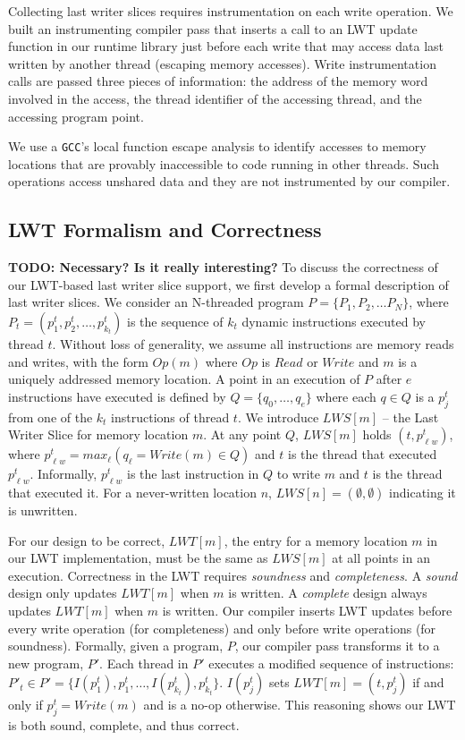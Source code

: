 \documentclass[preprint,9pt]{sigplanconf}
\newcommand{\lwt}{LWT\xspace}
\begin{document}
Collecting last writer slices requires instrumentation on each write operation.
We built an instrumenting compiler pass that inserts a call to an \lwt update
function in our runtime library just before each write that may access data
last written by another thread (escaping memory accesses).  Write
instrumentation calls are passed three pieces of information: the address of
the memory word involved in the access, the thread identifier of the accessing
thread, and the accessing program point.   

We use a {\tt GCC}'s local function escape analysis to identify accesses to
memory locations that are provably inaccessible to code running in other
threads.  Such operations access unshared data and they are not instrumented by
our compiler.  


\subsection{\lwt Formalism and Correctness}
{\bf TODO: Necessary?  Is it really interesting?}
\label{sec:lwssoundness}
To discuss the correctness of our \lwt-based last writer slice support, we
first develop a formal description of last writer slices.  We consider an
N-threaded program $P = \{P_1, P_2, \ldots P_N\}$, where $P_t = (p^{t}_{1},
p^{t}_{2}, \ldots, p^{t}_{k_{t}})$ is the sequence of $k_{t}$ dynamic
instructions executed by thread $t$.  Without loss of generality, we assume all
instructions are memory reads and writes, with the form $Op(m)$ where $Op$ is
$Read$ or $Write$ and $m$ is a uniquely addressed memory location.
A point in an execution of $P$ after $e$ instructions have
executed is defined by $Q = \{q_{0}, \ldots, q_{e}\}$ where each $q \in Q$ is a
$p^{t}_{j}$ from one of the $k_t$ instructions of thread $t$.  We introduce
$LWS[m]$ -- the Last Writer Slice for memory location $m$.   At any point $Q$,
$LWS[m]$ holds $(t,p^{t}_{\ell w})$, where $p^{t}_{\ell w} = max_{\ell}( 
q_{\ell} = Write(m) \in Q)$ and $t$ is the thread that
executed $p^{t}_{\ell w}$. Informally, $p^{t}_{\ell w}$ is the last instruction
in $Q$ to write $m$ and $t$ is the thread that executed it.  For a
never-written location $n$, $LWS[n] = (\emptyset,\emptyset)$ indicating it is
unwritten.

For our design to be correct, $LWT[m]$, the entry for a memory location $m$ in
our \lwt implementation, must be the same as $LWS[m]$ at all points in an
execution.  Correctness in the \lwt requires {\em soundness} and {\em
completeness}.  A {\em sound} design only updates $LWT[m]$ when $m$ is written.
A {\em complete} design always updates $LWT[m]$ when $m$ is written.  Our
compiler inserts \lwt updates before every write operation (for completeness)
and only before write operations (for soundness).  Formally, given a program,
$P$, our compiler pass transforms it to a new program, $P'$.  Each thread in
$P'$ executes a modified sequence of instructions: $P'_{t} \in P' = \{
I(p^{t}_{1}), p^{t}_{1}, \ldots, I(p^{t}_{k_{t}}), p^{t}_{k_{t}} \}$.
$I(p^{t}_{j})$ sets $LWT[m] = (t,p^{t}_{j})$ if and only if $p^{t}_{j} =
Write(m)$ and is a no-op otherwise.  This reasoning shows our \lwt is both
sound, complete, and thus correct.
\end{document}
